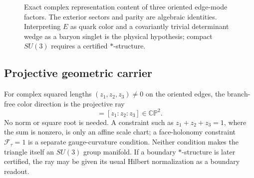 \documentclass[11pt,letterpaper]{article}
\begin{document}
\begin{figure}[htb]
\centering
{}
\caption{Exact complex representation content of three oriented edge-mode
factors. The exterior sectors and parity are algebraic identities. Interpreting
$E$ as quark color and a covariantly trivial determinant wedge as a baryon
singlet is the physical hypothesis; compact $SU(3)$ requires a certified
$*$-structure.}
\label{fig:triangle}
\end{figure}

\subsection{Projective geometric carrier}

For complex squared lengths $(z_1,z_2,z_3)\ne0$ on the oriented edges, the
branch-free color direction is the projective ray
\begin{equation*}
  [c]=[z_1:z_2:z_3]\in\mathbb{CP}^{2}.
\end{equation*}
No norm or square root is needed. A constraint such as
$z_1+z_2+z_3=1$, where the sum is nonzero, is only an affine scale chart; a
face-holonomy constraint $\mathcal F_\tau=1$ is a separate gauge-curvature
condition. Neither condition makes the triangle itself an $SU(3)$ group
manifold. If a boundary $*$-structure is later certified, the ray may be given
its usual Hilbert normalization as a boundary readout.
\end{document}
